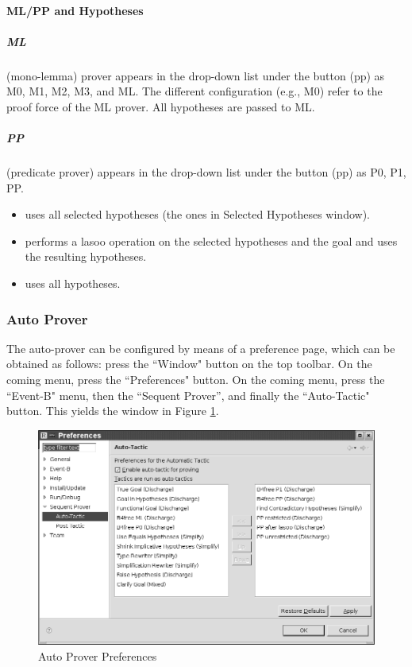 \paragraph{ML/PP and Hypotheses}

\subparagraph{ML}

 (mono-lemma) prover appears in the drop-down list under the button (pp) as M0, M1, M2, M3, and ML. The different configuration (e.g., M0) refer to the proof force of the ML prover. All hypotheses are passed to ML.

\subparagraph{PP}

 (predicate prover) appears in the drop-down list under the button (pp) as P0, P1, PP.

\begin{itemize}
	\item {} uses all selected hypotheses (the ones in Selected Hypotheses window).
	\item {} performs a lasoo operation on the selected hypotheses and the goal and uses the resulting hypotheses.
	\item {} uses all hypotheses. 
\end{itemize}

\subsubsection{Auto Prover}
\label{auto_prover}

The auto-prover can be configured by means of a preference page, which can be obtained as follows: press the ``Window" button on the top toolbar. On the coming menu, press the ``Preferences" button. On the coming menu, press the ``Event-B" menu, then the ``Sequent Prover'', and finally the ``Auto-Tactic" button. This yields the window in Figure \ref{fig_ref_10_auto_prover_pref}.

\begin{figure}[!ht]
\begin{center}
	\includegraphics{img/reference/ref_10_auto_prover_pref.png}
	\caption{Auto Prover Preferences}
	\label{fig_ref_10_auto_prover_pref}
\end{center}
\end{figure}

